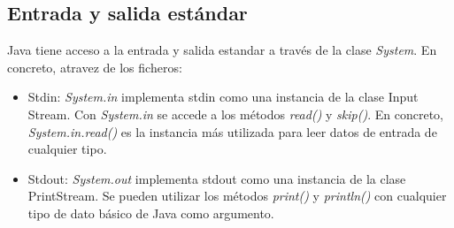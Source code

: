 \documentclass[12pt]{article}
\begin{document}
\subsection{Entrada y salida est\'andar}
Java tiene acceso a la entrada y salida estandar a trav\'es de la clase \textit{System}. En concreto, atravez de los ficheros:
\begin{itemize}
\item Stdin: \textit{System.in} implementa stdin como una instancia de la clase Input Stream. Con \textit{System.in} se accede a los m\'etodos \textit{read()} y \textit{skip()}. En concreto, \textit{System.in.read()} es la instancia más utilizada para leer datos de entrada de cualquier tipo.
\item Stdout: \textit{System.out} implementa stdout como una instancia de la clase PrintStream. Se pueden utilizar los m\'etodos \textit{print()} y \textit{println()} con cualquier tipo de dato b\'asico de Java como argumento.
\end{itemize}

\nocite{*}
 
\end{document}
